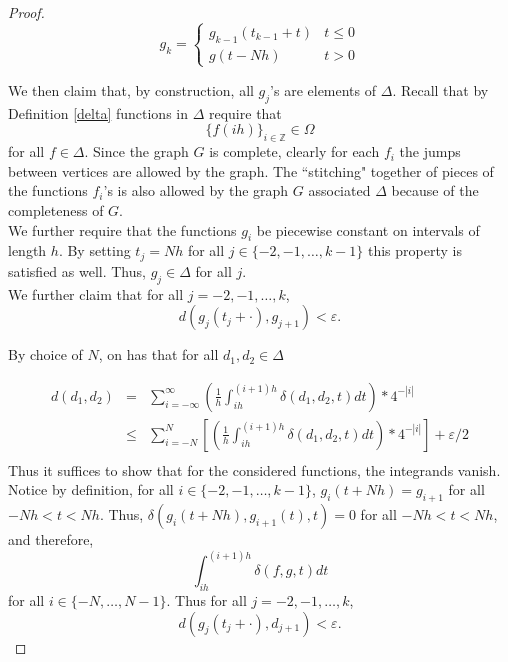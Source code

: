 \documentclass[11pt]{article}
\begin{document}
\begin{proof}
   $$g_k=\left\{
     \begin{array}{lr}
       g_{k-1}(t_{k-1}+t) &  t\leq 0\\
       g(t-Nh) &  t>0
     \end{array}
   \right.$$

We then claim that, by construction, all $g_j$'s are elements of $\Delta$.  Recall that by Definition \ref{delta} functions in $\Delta$ require that 
$$\{f(ih)\}_{i\in\mathbb{Z}}\in\Omega$$ for all $f\in\Delta$. Since the graph $G$ is complete, clearly for each $f_i$ the jumps between vertices are allowed by the graph.  The ``stitching" together of pieces of the functions $f_i$'s is also allowed by the graph $G$ associated $\Delta$ because of the completeness of $G$. \\
We further require that the functions $g_i$ be piecewise constant on intervals of length $h$.  By setting $t_j=Nh$ for all $j\in\{-2,-1,\ldots,k-1\}$ this property is satisfied as well.  Thus, $g_j\in\Delta$ for all $j$.
 \\



\indent We further claim that for all $j=-2,-1,\ldots,k$,
$$d(g_j(t_j+\cdot),g_{j+1})<\varepsilon.$$

By choice of $N$, on has that for all $d_1,d_2\in\Delta$

\begin{eqnarray*}
d(d_1,d_2)&=& \displaystyle\sum_{i=-\infty}^\infty \left(\frac{1}{h}\displaystyle\int_{ih}^{(i+1)h}\delta(d_1,d_2,t)dt\right)*4^{-|i|}\\
&\leq& \displaystyle\sum_{i=-N}^N\left[ \left(\frac{1}{h}\displaystyle\int_{ih}^{(i+1)h}\delta(d_1,d_2,t)dt\right)*4^{-|i|}\right] +\varepsilon/2\\
\end{eqnarray*}
Thus it suffices to show that for the considered functions, the integrands vanish.  Notice by definition, for all $i\in\{-2,-1,\ldots,k-1\}$,
$g_i(t+Nh)=g_{i+1}$ for all $-Nh<t<Nh$.  Thus, 
$\delta(g_i(t+Nh),g_{i+1}(t),t)=0$ for all $-Nh<t<Nh$, and therefore,
$$\displaystyle\int_{ih}^{(i+1)h}\delta(f,g,t)dt$$ for all $i\in\{-N,\ldots,N-1\}$.
Thus for all $j=-2,-1,\ldots,k$,
$$d(g_j(t_j+\cdot),d_{j+1})<\varepsilon.$$
\end{proof}







\end{document}
